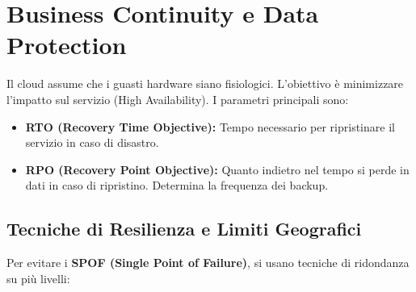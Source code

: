 \section{Business Continuity e Data Protection}
Il cloud assume che i guasti hardware siano fisiologici. L'obiettivo è minimizzare l'impatto sul servizio (High Availability).
I parametri principali sono:
\begin{itemize}
    \item \textbf{RTO (Recovery Time Objective):} Tempo necessario per ripristinare il servizio in caso di disastro.
    \item \textbf{RPO (Recovery Point Objective):} Quanto indietro nel tempo si perde in dati in caso di ripristino. Determina la frequenza dei backup.
\end{itemize}

\subsection{Tecniche di Resilienza e Limiti Geografici}
Per evitare i \textbf{SPOF (Single Point of Failure)}, si usano tecniche di ridondanza su più livelli:
